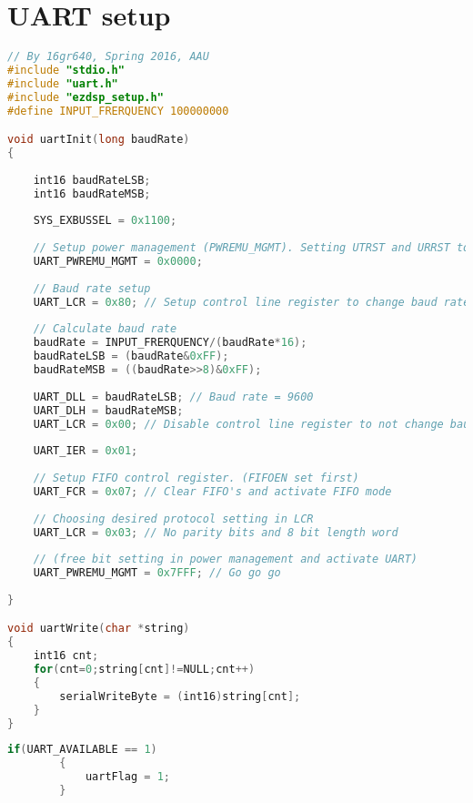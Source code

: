 \section{UART setup} \label{UART_setup}

\begin{lstlisting}[language=C, caption = {Initialization of UART},label={listingUartInit}]
// By 16gr640, Spring 2016, AAU
#include "stdio.h"
#include "uart.h"
#include "ezdsp_setup.h"
#define INPUT_FRERQUENCY 100000000

void uartInit(long baudRate)
{
	
	int16 baudRateLSB;
	int16 baudRateMSB;
	
	SYS_EXBUSSEL = 0x1100;
	
	// Setup power management (PWREMU_MGMT). Setting UTRST and URRST to 0
	UART_PWREMU_MGMT = 0x0000;
	
	// Baud rate setup 
	UART_LCR = 0x80; // Setup control line register to change baud rate
	
	// Calculate baud rate
	baudRate = INPUT_FRERQUENCY/(baudRate*16);
	baudRateLSB = (baudRate&0xFF);
	baudRateMSB = ((baudRate>>8)&0xFF);
	
	UART_DLL = baudRateLSB; // Baud rate = 9600
	UART_DLH = baudRateMSB;
	UART_LCR = 0x00; // Disable control line register to not change baud rate
	
	UART_IER = 0x01;
	
	// Setup FIFO control register. (FIFOEN set first) 
	UART_FCR = 0x07; // Clear FIFO's and activate FIFO mode
	
	// Choosing desired protocol setting in LCR
	UART_LCR = 0x03; // No parity bits and 8 bit length word
	
	// (free bit setting in power management and activate UART)
	UART_PWREMU_MGMT = 0x7FFF; // Go go go
	
}

void uartWrite(char *string)
{
	int16 cnt;
	for(cnt=0;string[cnt]!=NULL;cnt++)
	{
		serialWriteByte = (int16)string[cnt];
	}
}
\end{lstlisting}

\begin{lstlisting}[language=C, caption = {Set a flag high if data available in FIFO},label={listingUartFlag}]
    	if(UART_AVAILABLE == 1)
    	{	
			uartFlag = 1;
		}
\end{lstlisting}

